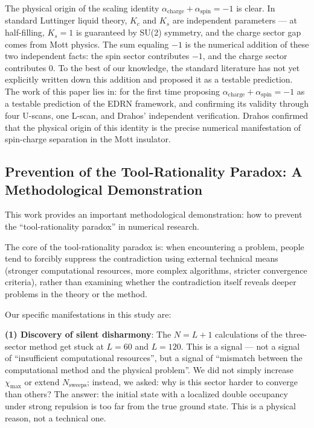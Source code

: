 \documentclass[prb,reprint,twocolumn,superscriptaddress]{revtex4-2}
\begin{document}
The physical origin of the scaling identity $\alpha_{\mathrm{charge}} + \alpha_{\mathrm{spin}} = -1$ is clear. In standard Luttinger liquid theory, $K_c$ and $K_s$ are independent parameters --- at half-filling, $K_s = 1$ is guaranteed by SU(2) symmetry, and the charge sector gap comes from Mott physics. The sum equaling $-1$ is the numerical addition of these two independent facts: the spin sector contributes $-1$, and the charge sector contributes $0$. To the best of our knowledge, the standard literature has not yet explicitly written down this addition and proposed it as a testable prediction. The work of this paper lies in: for the first time proposing $\alpha_{\mathrm{charge}} + \alpha_{\mathrm{spin}} = -1$ as a testable prediction of the EDRN framework, and confirming its validity through four U-scans, one L-scan, and Drahos' independent verification. Drahos confirmed that the physical origin of this identity is the precise numerical manifestation of spin-charge separation in the Mott insulator.

\subsection{Prevention of the Tool-Rationality Paradox: A Methodological Demonstration}

This work provides an important methodological demonstration: how to prevent the ``tool-rationality paradox'' in numerical research.

The core of the tool-rationality paradox is: when encountering a problem, people tend to forcibly suppress the contradiction using external technical means (stronger computational resources, more complex algorithms, stricter convergence criteria), rather than examining whether the contradiction itself reveals deeper problems in the theory or the method.

Our specific manifestations in this study are:

\textbf{(1) Discovery of silent disharmony}: The $N = L+1$ calculations of the three-sector method get stuck at $L = 60$ and $L = 120$. This is a signal --- not a signal of ``insufficient computational resources'', but a signal of ``mismatch between the computational method and the physical problem''. We did not simply increase $\chi_{\max}$ or extend $N_{\text{sweeps}}$; instead, we asked: why is this sector harder to converge than others? The answer: the initial state with a localized double occupancy under strong repulsion is too far from the true ground state. This is a physical reason, not a technical one.
\end{document}

